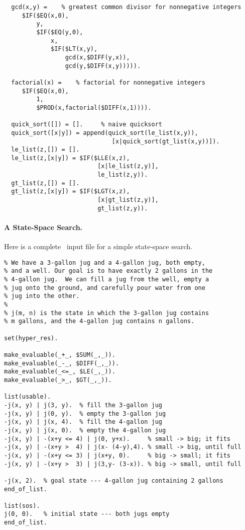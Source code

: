 \documentclass[11pt]{article}
\begin{document}
{\small
\begin{verbatim}
  gcd(x,y) =    % greatest common divisor for nonnegative integers
     $IF($EQ(x,0),
         y,
         $IF($EQ(y,0),
             x,
             $IF($LT(x,y),
                 gcd(x,$DIFF(y,x)),
                 gcd(y,$DIFF(x,y))))).

  factorial(x) =    % factorial for nonnegative integers
     $IF($EQ(x,0),
         1,
         $PROD(x,factorial($DIFF(x,1)))).

  quick_sort([]) = [].     % naive quicksort
  quick_sort([x|y]) = append(quick_sort(le_list(x,y)),
                              [x|quick_sort(gt_list(x,y))]).
  le_list(z,[]) = [].
  le_list(z,[x|y]) = $IF($LLE(x,z),
                          [x|le_list(z,y)],
                          le_list(z,y)).
  gt_list(z,[]) = [].
  gt_list(z,[x|y]) = $IF($LGT(x,z),
                          [x|gt_list(z,y)],
                          gt_list(z,y)).
\end{verbatim}
}

\paragraph{A State-Space Search.}
Here is a complete \otter\ input file for a simple state-space search.

{\small
\begin{verbatim}
% We have a 3-gallon jug and a 4-gallon jug, both empty,
% and a well. Our goal is to have exactly 2 gallons in the
% 4-gallon jug.  We can fill a jug from the well, empty a
% jug onto the ground, and carefully pour water from one
% jug into the other.
%
% j(m, n) is the state in which the 3-gallon jug contains
% m gallons, and the 4-gallon jug contains n gallons.
 
set(hyper_res).

make_evaluable(_+_, $SUM(_,_)).
make_evaluable(_-_, $DIFF(_,_)).
make_evaluable(_<=_, $LE(_,_)).
make_evaluable(_>_, $GT(_,_)).

list(usable).
-j(x, y) | j(3, y).  % fill the 3-gallon jug
-j(x, y) | j(0, y).  % empty the 3-gallon jug
-j(x, y) | j(x, 4).  % fill the 4-gallon jug
-j(x, y) | j(x, 0).  % empty the 4-gallon jug
-j(x, y) | -(x+y <= 4) | j(0, y+x).     % small -> big; it fits
-j(x, y) | -(x+y >  4) | j(x- (4-y),4). % small -> big, until full
-j(x, y) | -(x+y <= 3) | j(x+y, 0).     % big -> small; it fits
-j(x, y) | -(x+y >  3) | j(3,y- (3-x)). % big -> small, until full

-j(x, 2).  % goal state --- 4-gallon jug containing 2 gallons
end_of_list.

list(sos).
j(0, 0).   % initial state --- both jugs empty
end_of_list.
\end{verbatim}
}
\end{document}
